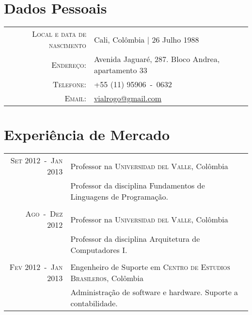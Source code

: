 \documentclass[a4paper,10pt]{article}
\begin{document}
\pagestyle{empty} %

\par{\bigskip\par}

\section{Dados Pessoais}

\begin{tabular}{rl}
  \textsc{Local e data de nascimento} & Cali, Colômbia  | 26 Julho 1988 \\
  \textsc{Endereço:}                  & Avenida Jaguaré, 287. Bloco Andrea, apartamento 33 \\
  \textsc{Telefone:}                  & +55 (11) 95906~-~0632 \\
  \textsc{Email:}                     & \href{mailto:vialrogo@gmail.com}{vialrogo@gmail.com} \\
\end{tabular}

\section{Experiência de Mercado}
\begin{tabular}{rl}

  \textsc{Set 2012~-~Jan 2013}  & Professor na \textsc{Universidad del Valle}, Colômbia \\
                                &\footnotesize{Professor da disciplina Fundamentos de Linguagens de Programação.} \\
                                &\\

  \textsc{Ago~-~Dez 2012}       & Professor na \textsc{Universidad del Valle}, Colômbia \\
                                &\footnotesize{Professor da disciplina Arquitetura de Computadores I.} \\
                                &\\

  \textsc{Fev 2012~-~Jan 2013}  & Engenheiro de Suporte em \textsc{Centro de Estudios Brasileros}, Colômbia \\
                                &\footnotesize{Administração de software e hardware. Suporte a contabilidade.} \\

\end{tabular}
\end{document}
